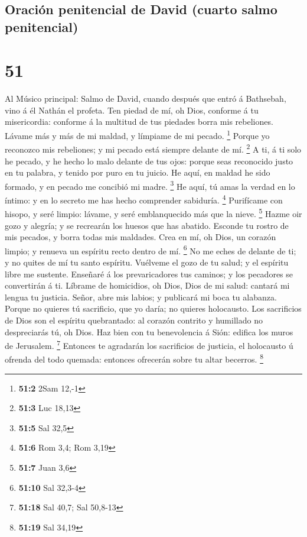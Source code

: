 \hypertarget{oraciuxf3n-penitencial-de-david-cuarto-salmo-penitencial}{%
\subsection{Oración penitencial de David (cuarto salmo
penitencial)}\label{oraciuxf3n-penitencial-de-david-cuarto-salmo-penitencial}}

\hypertarget{section-50}{%
\section{51}\label{section-50}}

 Al Músico principal: Salmo de David, cuando después que
entró á Bathsebah, vino á él Nathán el profeta. Ten piedad de mí, oh
Dios, conforme á tu misericordia: conforme á la multitud de tus piedades
borra mis rebeliones.  Lávame más y más de mi maldad, y
límpiame de mi pecado. \footnote{\textbf{51:2} 2Sam 12,-1} 
Porque yo reconozco mis rebeliones; y mi pecado está siempre delante de
mí. \footnote{\textbf{51:3} Luc 18,13}  A ti, á ti solo he
pecado, y he hecho lo malo delante de tus ojos: porque seas reconocido
justo en tu palabra, y tenido por puro en tu juicio.  He
aquí, en maldad he sido formado, y en pecado me concibió mi madre.
\footnote{\textbf{51:5} Sal 32,5}  He aquí, tú amas la
verdad en lo íntimo: y en lo secreto me has hecho comprender sabiduría.
\footnote{\textbf{51:6} Rom 3,4; Rom 3,19}  Purifícame con
hisopo, y seré limpio: lávame, y seré emblanquecido más que la nieve.
\footnote{\textbf{51:7} Juan 3,6}  Hazme oir gozo y alegría;
y se recrearán los huesos que has abatido.  Esconde tu
rostro de mis pecados, y borra todas mis maldades.  Crea en
mí, oh Dios, un corazón limpio; y renueva un espíritu recto dentro de
mí. \footnote{\textbf{51:10} Sal 32,3-4}  No me eches de
delante de ti; y no quites de mí tu santo espíritu. 
Vuélveme el gozo de tu salud; y el espíritu libre me sustente.
 Enseñaré á los prevaricadores tus caminos; y los pecadores
se convertirán á ti.  Líbrame de homicidios, oh Dios, Dios
de mi salud: cantará mi lengua tu justicia.  Señor, abre
mis labios; y publicará mi boca tu alabanza.  Porque no
quieres tú sacrificio, que yo daría; no quieres holocausto.
 Los sacrificios de Dios son el espíritu quebrantado: al
corazón contrito y humillado no despreciarás tú, oh Dios. 
Haz bien con tu benevolencia á Sión: edifica los muros de Jerusalem.
\footnote{\textbf{51:18} Sal 40,7; Sal 50,8-13}  Entonces
te agradarán los sacrificios de justicia, el holocausto ú ofrenda del
todo quemada: entonces ofrecerán sobre tu altar becerros. \footnote{\textbf{51:19}
  Sal 34,19}

